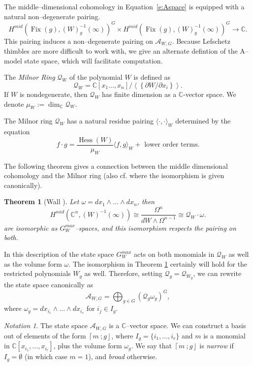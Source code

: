 \documentclass[10pt, letterpaper]{amsart}
\newtheorem{thm}{Theorem}%
\theoremstyle{remark}
\newtheorem{notat}{Notation}
\newcommand{\CC}{\mathbb C}
\newcommand{\sA}{\mathscr{A}}
\newcommand{\sQ}{\mathscr{Q}}
\newcommand{\fjrw}[2]{ \left\lceil #1 \:; #2 \right\rfloor }
\newcommand{\defital}{\textit}
\newcommand{\zero}{\mathbf 0}
\DeclareMathOperator{\Hess}{Hess}
\DeclareMathOperator{\Fix}{Fix}
\begin{document}
The middle--dimensional cohomology in Equation~\ref{e:Aspace} is equipped with a natural non--degenerate pairing.
\[
H^{mid} (\Fix(g),(W)_g^{-1}( \infty))^G \times H^{mid} (\Fix(g),(W)_g^{-1}( \infty))^G\to \CC. 
\]
This pairing induces a non--degenerate pairing on $\sA_{W,G}$. Because Lefschetz thimbles are more difficult to work with, we give an alternate defintion of the A--model state space, which will facilitate computation. 

The \defital{Milnor Ring} $\sQ_W$ of the polynomial $W$ is defined as 
\[
\sQ_W =\CC[x_1 \ldots, x_n]/
\left\langle\left\{\partial W/\partial x_i\right\}\right\rangle.
\]
If $W$ is nondegenerate, then $\sQ_W$ has finite dimension as a $\CC$-vector space. We denote $\mu_W:=\dim_\CC \sQ_W$. 

The Milnor ring $\sQ_W$ has a natural residue pairing $\langle \cdot , \cdot\rangle_W$ determined by the equation 
 \begin{equation}\label{e:milpairing}
f\cdot g =  \frac{\Hess(W)}{\mu_W}\langle f, g\rangle_W+ \text{ lower order terms}.%
 \end{equation}

The following theorem gives a connection between the middle dimensional cohomology and the Milnor ring (also cf. \cite{ChIR} where the isomorphism is given canonically). 

\begin{thm}[Wall \cite{Wall1}]\label{t:Wall}
Let $\omega = dx_1 \wedge \ldots \wedge dx_n$, then 
\[
H^{mid} (\CC^n,(W)^{-1}( \infty)) \cong  \frac{ \Omega^n}{dW \wedge\Omega^{n-1}} \cong \sQ_W\cdot \omega.
\]
are isomorphic as $G_W^{max}$--spaces, and this isomorphism respects the pairing on both. 
\end{thm}

In this description of the state space %
$G_W^{max}$  acts on both monomials in $\sQ_W$ as well as the volume form $\omega$.
The isomorphism in Theorem \ref{t:Wall} certainly will hold for the restricted polynomials $W_g$ as well.  Therefore, setting $\sQ_g=\sQ_{W_g}$, we can rewrite the state space canonically as 
\begin{equation}\label{state_space}
\sA_{W,G} = \bigoplus_{g \in G} \left(\sQ_g \omega_g \right)^G,
\end{equation}
where $\omega_g = dx_{i_1} \wedge \ldots \wedge dx_{i_s}$ for $i_j \in I_g$.

\begin{notat}\label{FJRWNotation}
The state space $\sA_{W,G}$ is a $\CC$--vector space. We can construct a basis out of elements of the form $\fjrw{m}{g}$, where $I_g = \{i_1, \ldots, i_r\}$ and $m$ is a monomial in $\CC[x_{i_1}, \ldots, x_{i_r}]$, plus the volume form $\omega_g$.  We say that $\fjrw{m}{g}$ is \defital{narrow} if $ I_g = \emptyset$ (in which case $m=1$), and \defital{broad} otherwise.
\end{notat}
\end{document}
